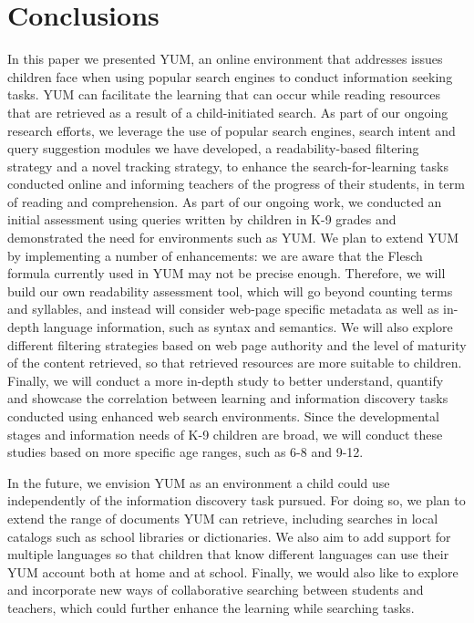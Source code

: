 \documentclass{sig-alternate-05-2015}
\begin{document}
\section{Conclusions}


In this paper we presented YUM, an online environment that addresses issues children face when using popular search engines to conduct information seeking tasks. YUM can facilitate the learning that can occur while reading resources that are retrieved as a result of a child-initiated search. As part of our ongoing research efforts, we leverage the use of popular search engines, search intent and query suggestion modules we have developed, a readability-based filtering strategy and a novel tracking strategy, to enhance the search-for-learning tasks conducted online and informing teachers of the progress of their students, in term of reading and comprehension. As part of our ongoing work, we conducted an initial assessment using queries written by children in K-9 grades and demonstrated the need for environments such as YUM. 
We plan to extend YUM by implementing a number of enhancements: we are aware that the Flesch formula currently used in YUM may not be precise enough. Therefore, we will build our own readability assessment tool, which will go beyond counting terms and syllables, and instead will consider web-page specific metadata as well as in-depth language information, such as syntax and semantics.  We will also explore different filtering strategies based on web page authority and the level of maturity of the content retrieved, so that retrieved resources are more suitable to children.  Finally, we will conduct a more in-depth study to better understand, quantify and showcase the correlation between learning and information discovery tasks conducted using enhanced web search environments.  Since the developmental stages and information needs of K-9 children are broad, we will conduct these studies based on more specific age ranges, such as 6-8 and 9-12. 

In the future, we envision YUM as an environment a child could use independently of the information discovery task pursued. For doing so, we plan to extend the range of documents YUM can retrieve, including searches in local catalogs such as school libraries or dictionaries. We also aim to add support for multiple languages so that children that know different languages can use their YUM account both at home and at school. Finally, we would also like to explore and incorporate new ways of collaborative searching between students and teachers, which could further enhance the learning while searching tasks. 
\end{document}
